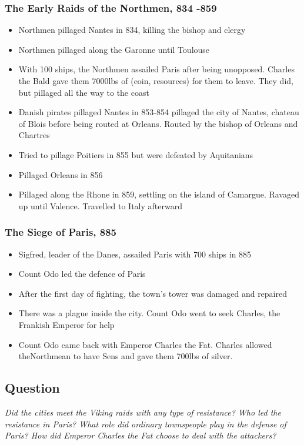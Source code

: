 \documentclass[12pt]{article}
\begin{document}
\subsubsection*{The Early Raids of the Northmen, 834 -859}
\begin{itemize}
	\item Northmen pillaged Nantes in 834, killing the bishop and clergy
	\item Northmen pillaged along the Garonne until Toulouse
	\item With 100 ships, the Northmen assailed Paris after being unopposed. Charles the Bald gave them 7000lbs of (coin, resources) for them to leave. They did, but pillaged all the way to the coast
	\item Danish pirates pillaged Nantes in 853-854 pillaged the city of Nantes, chateau of Blois before being routed at Orleans. Routed by the bishop of Orleans and Chartres
	\item Tried to pillage Poitiers in 855 but were defeated by Aquitanians
	\item Pillaged Orleans in 856
	\item Pillaged along the Rhone in 859, settling on the island of Camargue. Ravaged up until Valence. Travelled to Italy afterward
\end{itemize}

\subsubsection*{The Siege of Paris, 885}
\begin{itemize}
	\item Sigfred, leader of the Danes, assailed Paris with 700 ships in 885
	\item Count Odo led the defence of Paris
	\item After the first day of fighting, the town's tower was damaged and repaired
	\item There was a plague inside the city. Count Odo went to seek Charles, the Frankish Emperor for help
	\item Count Odo came back with Emperor Charles the Fat. Charles allowed theNorthmean to have Sens and gave them 700lbs of silver.
\end{itemize}
	
\subsection*{Question}

\begin{center}
	\textit{Did the cities meet the Viking raids with any type of resistance? Who led the resistance in Paris? What role did ordinary townspeople play in the defense of Paris? How did Emperor Charles the Fat choose to deal with the attackers?}
\end{center}
\end{document}

